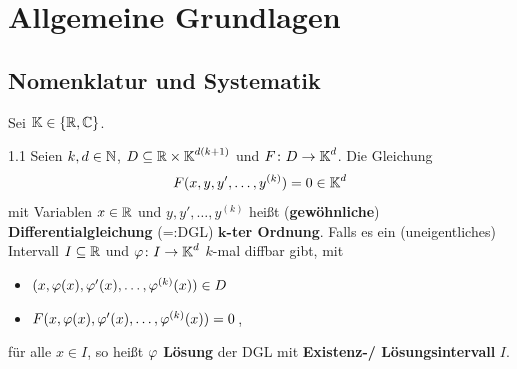 \documentclass[a4paper]{article}
\begin{document}

\section{Allgemeine Grundlagen}
\subsection{Nomenklatur und Systematik}
Sei $\operatorname{\mathbb K}\in\{\mathbb R,\operatorname{\mathbb C}\}$.

\begin{Def}{}{1.1}
Seien $k,d\in\operatorname{\mathbb N}$, $D\subseteq \mathbb R\times \operatorname{\mathbb K}^{d(k+1)}$ und $F\colon D\to\operatorname{\mathbb K}^d$. Die Gleichung
\begin{equation}\label{eqn:1}
F(x,y,y',\ldots,y^{(k)})=0\in\operatorname{\mathbb K}^d
\end{equation}
mit Variablen $x\in\mathbb R$ und $y,y',\ldots,y^{(k)}$ heißt (\textbf{gewöhnliche}) \textbf{Differentialgleichung} (=:DGL) $\mathbf{k}$\textbf{-ter Ordnung}. Falls es ein (uneigentliches) Intervall $I\subseteq\mathbb R$ und $\operatorname{\varphi}\colon I\to\operatorname{\mathbb K}^d$ $k$-mal diffbar gibt, mit
\begin{itemize}
    \item $(x,\operatorname{\varphi}(x),\operatorname{\varphi}'(x),\ldots,\operatorname{\varphi}^{(k)}(x))\in D$
    \item $F(x,\operatorname{\varphi}(x),\operatorname{\varphi}'(x),\ldots,\operatorname{\varphi}^{(k)}(x))=0$\,,
\end{itemize}
für alle $x\in I$, so heißt $\operatorname{\varphi}$ \textbf{Lösung} der DGL mit \textbf{Existenz-/ Lösungsintervall} $I$.
\end{Def}
\end{document}
